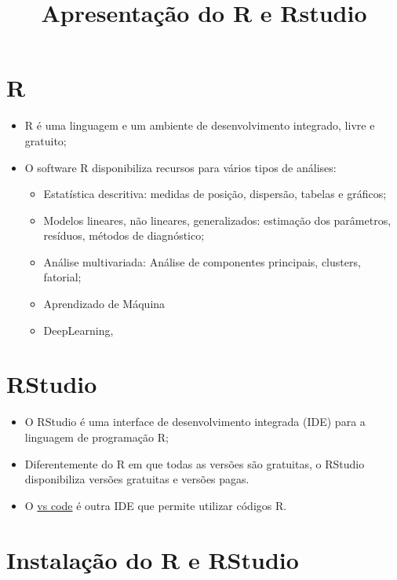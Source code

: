 \documentclass[
  letterpaper,
  DIV=11,
  numbers=noendperiod]{scrartcl}
\title{Apresentação do R e Rstudio}
\author{}
\date{}
\begin{document}
\maketitle

\section{R}\label{r}

\begin{itemize}
\item
  R é uma linguagem e um ambiente de desenvolvimento integrado, livre e
  gratuito;
\item
  O software R disponibiliza recursos para vários tipos de análises:

  \begin{itemize}
  \item
    Estatística descritiva: medidas de posição, dispersão, tabelas e
    gráficos;
  \item
    Modelos lineares, não lineares, generalizados: estimação dos
    parâmetros, resíduos, métodos de diagnóstico;
  \item
    Análise multivariada: Análise de componentes principais, clusters,
    fatorial;
  \item
    Aprendizado de Máquina
  \item
    DeepLearning,
  \end{itemize}
\end{itemize}

\section{RStudio}\label{rstudio}

\begin{itemize}
\item
  O RStudio é uma interface de desenvolvimento integrada (IDE) para a
  linguagem de programação R;
\item
  Diferentemente do R em que todas as versões são gratuitas, o RStudio
  disponibiliza versões gratuitas e versões pagas.
\item
  O \href{https://code.visualstudio.com/}{vs code} é outra IDE que
  permite utilizar códigos R.
\end{itemize}

\section{Instalação do R e
RStudio}\label{instalauxe7uxe3o-do-r-e-rstudio}
\end{document}
